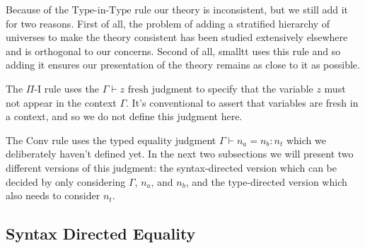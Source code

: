 \documentclass[sigplan,nonacm]{acmart}
\newcommand{\univE}{\text{Type}}
\newcommand{\tyEqJ}[4]{#1 \vdash #2 = #3 : #4}
\newcommand{\freshJ}[2]{#1 \vdash #2 \text{ fresh}}
\begin{document}
Because of the $\univE$-in-$\univE$ rule our theory is inconsistent, but we still add it for two reasons.
First of all, the problem of adding a stratified hierarchy of universes to make the theory consistent has been studied extensively elsewhere and is orthogonal to our concerns.
Second of all, smalltt uses this rule and so adding it ensures our presentation of the theory remains as close to it as possible.

The $\Pi$-I rule uses the $\freshJ{\Gamma}{z}$ judgment to specify that the variable $z$ must not appear in the context $\Gamma$.
It's conventional to assert that variables are fresh in a context, and so we do not define this judgment here.

The Conv rule uses the typed equality judgment $\tyEqJ{\Gamma}{n_a}{n_b}{n_t}$ which we deliberately haven't defined yet.
In the next two subsections we will present two different versions of this judgment: the syntax-directed version which can be decided by only considering $\Gamma$, $n_a$, and $n_b$, and the type-directed version which also needs to consider $n_t$.

\subsection{Syntax Directed Equality}
\end{document}
